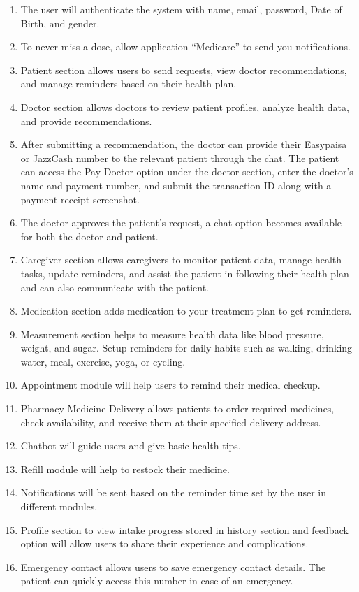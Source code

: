 \documentclass[12pt, a4paper, oneside]{report}
\begin{document}
\begin{enumerate}
    \item The user will authenticate the system with name, email, password, Date of Birth, and gender.
    \item To never miss a dose, allow application ``Medicare'' to send you notifications.
    \item Patient section allows users to send requests, view doctor recommendations, and manage reminders based on their health plan.
    \item Doctor section allows doctors to review patient profiles, analyze health data, and provide recommendations.
    \item After submitting a recommendation, the doctor can provide their Easypaisa or JazzCash number to the relevant patient through the chat. The patient can access the Pay Doctor option under the doctor section, enter the doctor's name and payment number, and submit the transaction ID along with a payment receipt screenshot.
    \item The doctor approves the patient's request, a chat option becomes available for both the doctor and patient.
    \item Caregiver section allows caregivers to monitor patient data, manage health tasks, update reminders, and assist the patient in following their health plan and can also communicate with the patient.
    \item Medication section adds medication to your treatment plan to get reminders.
    \item Measurement section helps to measure health data like blood pressure, weight, and sugar. Setup reminders for daily habits such as walking, drinking water, meal, exercise, yoga, or cycling.
    \item Appointment module will help users to remind their medical checkup.
    \item Pharmacy Medicine Delivery allows patients to order required medicines, check availability, and receive them at their specified delivery address.
    \item Chatbot will guide users and give basic health tips.
    \item Refill module will help to restock their medicine.
    \item Notifications will be sent based on the reminder time set by the user in different modules.
    \item Profile section to view intake progress stored in history section and feedback option will allow users to share their experience and complications.
    \item Emergency contact allows users to save emergency contact details. The patient can quickly access this number in case of an emergency.
\end{enumerate}
\end{document}
